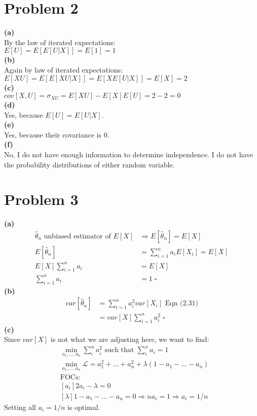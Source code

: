 \documentclass[fleqn]{article}
\newcommand{\Lagr}{\mathcal{L}}
\begin{document}
\begin{adjustwidth}{-2cm}{-2cm}
\section{Problem 2}
\textbf{(a)}\\
By the law of iterated expectations:\\
$E[U] = E[E[U \vert X]] = E[1] = 1$\\
\textbf{(b)}\\
Again by law of iterated expectations:\\
$E[XU] = E[E[XU \vert X]] = E[XE[U \vert X]] = E[X] = 2$\\ 
\textbf{(c)}\\
$cov[X,U] = \sigma_{XU} = E[XU] - E[X]E[U] = 2 - 2 = 0$\\
\textbf{(d)}\\
Yes, because $E[U] = E[U \vert X]$.\\
\textbf{(e)}\\
Yes, because their covariance is 0.\\
\textbf{(f)}\\
No, I do not have enough information to determine independence. I do not have the probability distributions of either random variable.

\section{Problem 3}
\textbf{(a)}
\begin{align*}
\hat{\theta}_{n} \text{ unbiased estimator of } E[X] &\Rightarrow E[\hat{\theta}_{n}] = E[X]\\
E[\hat{\theta}_{n}] &= \sum_{i=1}^{n}a_{i}E[X_{i}] = E[X]\\
E[X]\sum_{i=1}^{n}a_{i} &= E[X]\\
\sum_{i=1}^{n}a_{i} &= 1 \; \square
\end{align*}
\textbf{(b)}
\begin{align*}
var[\hat{\theta}_{n}] &= \sum_{i=1}^{n}a_{i}^{2}var[X_{i}] \text{  Eqn (2.31)}\\
&= var[X]\sum_{i=1}^{n}a_{i}^{2} \; \square
\end{align*}
\textbf{(c)}\\
Since $var[X]$ is not what we are adjusting here, we want to find:
\begin{align*}
&\min_{a_{1},...,a_{n}}\sum_{i}^{n}a_{i}^{2} \text{ such that } \sum_{i}^{n}a_{i} = 1\\
&\min_{a_{1},...,a_{n}}\Lagr= a_{1}^{2}+...+a_{n}^{2} + \lambda\left(1-a_{1}-...-a_{n}\right)\\
&\text{FOCs:}\\
&[a_{i}] 2a_{i} - \lambda = 0\\
&[\lambda] 1-a_{1}-...-a_{n} = 0 \Rightarrow na_{i} = 1 \Rightarrow a_{i} = 1/n
\end{align*}
Setting all $a_{i} = 1/n$ is optimal.


\end{adjustwidth}
\end{document}
